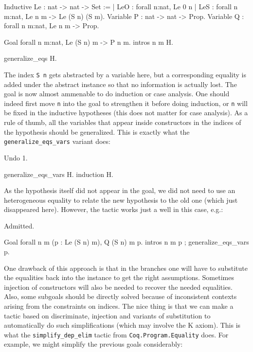 \begin{coq_example*}
\begin{coq_eval}
Inductive Le : nat -> nat -> Set :=
  | LeO : forall n:nat, Le 0 n
  | LeS : forall n m:nat, Le n m -> Le (S n) (S m).
Variable P : nat -> nat -> Prop.
Variable Q : forall n m:nat, Le n m -> Prop.
\end{coq_eval}

\begin{coq_example*}
Goal forall n m:nat, Le (S n) m -> P n m.
intros n m H.
\end{coq_example*}
\begin{coq_example}
generalize_eqs H.
\end{coq_example}

The index {\tt S n} gets abstracted by a variable here, but a
corresponding equality is added under the abstract instance so that no
information is actually lost. The goal is now almost ammenable to do induction
or case analysis. One should indeed first move {\tt n} into the goal to
strengthen it before doing induction, or {\tt n} will be fixed in
the inductive hypotheses (this does not matter for case analysis). 
As a rule of thumb, all the variables that appear inside constructors in
the indices of the hypothesis should be generalized. This is exactly
what the \texttt{generalize\_eqs\_vars} variant does:

\begin{coq_eval} 
Undo 1.
\end{coq_eval}
\begin{coq_example}
generalize_eqs_vars H.
induction H.
\end{coq_example}

As the hypothesis itself did not appear in the goal, we did not need to
use an heterogeneous equality to relate the new hypothesis to the old
one (which just disappeared here). However, the tactic works just a well
in this case, e.g.:

\begin{coq_eval}
Admitted.
\end{coq_eval}

\begin{coq_example}
Goal forall n m (p : Le (S n) m), Q (S n) m p.
intros n m p ; generalize_eqs_vars p.
\end{coq_example}

One drawback of this approach is that in the branches one will have to
substitute the equalities back into the instance to get the right
assumptions. Sometimes injection of constructors will also be needed to
recover the needed equalities. Also, some subgoals should be directly
solved because of inconsistent contexts arising from the constraints on 
 indices. The nice thing is that we can make a tactic based on
discriminate, injection and variants of substitution to automatically 
do such simplifications (which may involve the K axiom). 
This is what the {\tt simplify\_dep\_elim} tactic from
{\tt Coq.Program.Equality} does. For example, we might simplify the
previous goals considerably:


\end{coq_example*}
